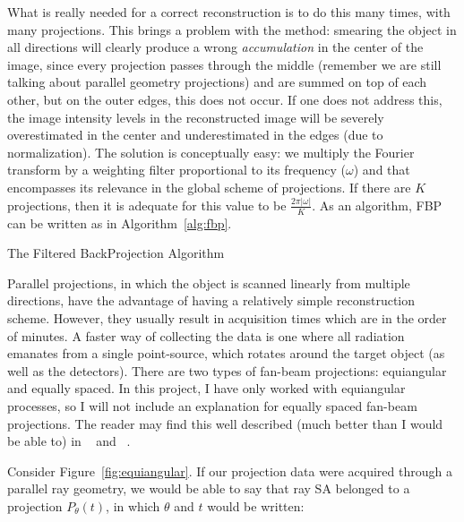 What is really needed for a correct reconstruction is to do this many
times, with many projections. This brings a problem with the method:
smearing the object in all directions will clearly produce a wrong
\emph{accumulation} in the center of the image, since every projection
passes through the middle (remember we are still talking about parallel
geometry projections) and are summed on top of each other, but on the
outer edges, this does not occur. If one does not address this, the
image intensity levels in the reconstructed image will be severely
overestimated in the center and underestimated in the edges (due to
normalization). The solution is conceptually easy: we multiply the
Fourier transform by a weighting filter proportional to its frequency
($\omega$) and that encompasses its relevance in the global scheme of
projections. If there are $K$ projections, then it is adequate for this
value to be $\frac{2\pi\lvert\omega\rvert}{K}$. As an algorithm,
\gls{FBP} can be written as in Algorithm~\ref{alg:fbp}.

\begin{algorithm}
    \caption{The Filtered BackProjection Algorithm}
    \label{alg:fbp}
    \SetAlgoLined
    
\end{algorithm}

Parallel projections, in which the object is scanned linearly from
multiple directions, have the advantage of having a relatively simple
reconstruction scheme. However, they usually result in acquisition times
which are in the order of minutes. A faster way of collecting the data
is one where all radiation emanates from a single point-source, which
rotates around the target object (as well as the detectors). There are
two types of fan-beam projections: equiangular and equally spaced. In
this project, I have only worked with equiangular processes, so I will
not include an explanation for equally spaced fan-beam projections. The
reader may find this well described (much better than I would be able
to) in ~\cite{Kak2001} and ~\cite{Herman1973}.

Consider Figure~\ref{fig:equiangular}. If our projection data were
acquired through a parallel ray geometry, we would be able to say that
ray SA belonged to a projection $P_{\theta}(t)$, in which $\theta$ and
$t$ would be written:

